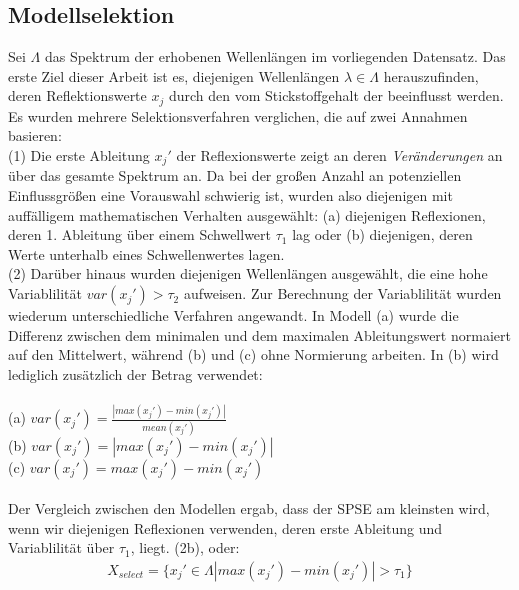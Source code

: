 	\subsection{Modellselektion}
	\label{ssec:modellselektion}
	Sei $\Lambda$ das Spektrum der erhobenen Wellenlängen im vorliegenden Datensatz.
	Das erste Ziel dieser Arbeit ist es, diejenigen Wellenlängen $\lambda\in\Lambda$ herauszufinden, deren Reflektionswerte $x_j$ durch den vom Stickstoffgehalt der beeinflusst werden.  
	Es wurden mehrere Selektionsverfahren verglichen, die auf zwei Annahmen basieren: \\
	(1) Die erste Ableitung $x_j'$ der Reflexionswerte zeigt an deren \textit{Veränderungen} an über das gesamte Spektrum an. 
	Da bei der großen Anzahl an potenziellen Einflussgrößen eine Vorauswahl schwierig ist, wurden also diejenigen mit auffälligem mathematischen Verhalten ausgewählt: (a) diejenigen Reflexionen, deren 1. Ableitung über einem Schwellwert $\tau_1$ lag oder (b) diejenigen, deren Werte unterhalb eines Schwellenwertes lagen.\\
	(2) Darüber hinaus wurden diejenigen Wellenlängen ausgewählt, die eine hohe Variablilität $var(x_j') > \tau_2$ aufweisen. 
	Zur Berechnung der Variablilität wurden wiederum unterschiedliche Verfahren angewandt. In Modell (a) wurde die Differenz zwischen dem minimalen und dem maximalen Ableitungswert normaiert auf den Mittelwert, während (b) und (c) ohne Normierung arbeiten. In (b) wird lediglich zusätzlich der Betrag verwendet: 	\\ \\
	(a) $var(x_j') = \frac{|max(x_j') - min(x_j')|}{mean(x_j')}$\\
	(b) $var(x_j') = |max(x_j') - min(x_j')|$\\
	(c) $var(x_j')= max(x_j') - min(x_j')$\\ \\
	Der Vergleich zwischen den Modellen ergab, dass der SPSE am kleinsten wird, wenn wir diejenigen Reflexionen verwenden, deren erste Ableitung und Variablilität über $\tau_1$, liegt. (2b), oder:
	\begin{align*}
		X_{select} = \{x_j' \in \Lambda |max(x_j') - min(x_j')| > \tau_1\}
	\end{align*}


